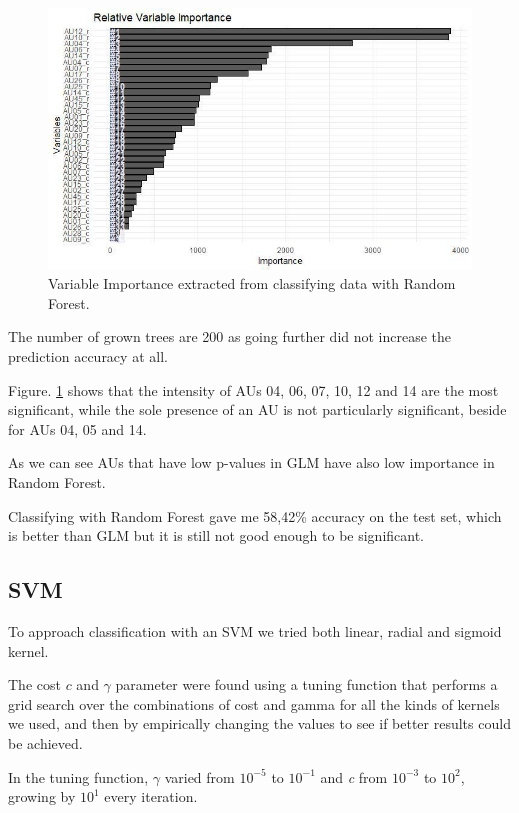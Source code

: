 \begin{figure}[H]
	\centering
	\includegraphics[width=1\textwidth]{images/varimp}
	\caption{Variable Importance extracted from classifying data with Random Forest.}
	\label{fig:varimp}
\end{figure}

The number of grown trees are 200 as going further did not increase the prediction accuracy at all.

Figure. \ref{fig:varimp} shows that the intensity of AUs 04, 06, 07, 10, 12 and 14 are the most significant, while the sole presence of an AU is not particularly significant, beside for AUs 04, 05 and 14.

As we can see AUs that have low p-values in GLM have also low importance in Random Forest.

Classifying with Random Forest gave me 58,42\% accuracy on the test set, which is better than GLM but it is still not good enough to be significant.

\clearpage

\subsection{SVM} \label{SVM}
To approach classification with an SVM we tried both linear, radial and sigmoid kernel.

The cost $c$ and $\gamma$ parameter were found using a tuning function that performs a grid search over the combinations of cost and gamma for all the kinds of kernels we used, and then by empirically changing the values to see if better results could be achieved. 

In the tuning function, $\gamma$ varied from $10^{-5}$ to $10^{-1}$ and \textit{c} from $10^{-3}$ to $10^2$, growing by $10^1$ every iteration. 

